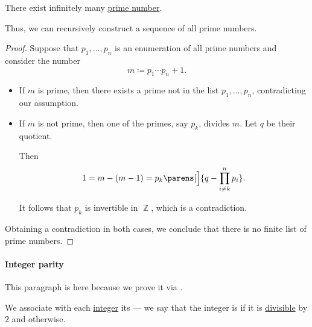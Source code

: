 \begin{theorem}\label{thm:euclids_prime_infinitude_theorem}
  There exist infinitely many \hyperref[def:prime_number]{prime number}.
\end{theorem}
\begin{comments}
  \item Thus, we can recursively construct a sequence of all prime numbers.
\end{comments}
\begin{proof}
  Suppose that \( p_1, \ldots, p_n \) is an enumeration of all prime numbers and consider the number
  \begin{equation*}
    m \coloneqq p_1 \cdots p_n + 1.
  \end{equation*}

  \begin{itemize}
    \item If \( m \) is prime, then there exists a prime not in the list \( p_1, \ldots, p_n \), contradicting our assumption.

    \item If \( m \) is not prime, then one of the primes, say \( p_k \), divides \( m \). Let \( q \) be their quotient.

    Then
    \begin{equation*}
      1 = m - (m - 1) = p_k \parens[\Big]{ q - \prod_{i \neq k}^n p_i }.
    \end{equation*}

    It follows that \( p_k \) is invertible in \( \BbbZ \), which is a contradiction.
  \end{itemize}

  Obtaining a contradiction in both cases, we conclude that there is no finite list of prime numbers.
\end{proof}

\paragraph{Integer parity}

This paragraph is here because we prove it via .

\begin{definition}\label{def:integer_parity}\mimprovised
  We associate with each \hyperref[def:integers]{integer} its  --- we say that the integer is  if it is \hyperref[def:divisibility]{divisible} by \( 2 \) and  otherwise.
\end{definition}

